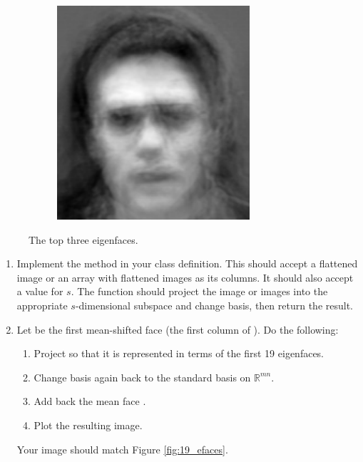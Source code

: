 \begin{figure}
\begin{subfigure}[b]{0.3\textwidth}
\end{subfigure}
\begin{subfigure}[b]{0.3\textwidth}
\includegraphics[width=\textwidth]{figures/eigenface2.pdf}
\end{subfigure}
\caption{The top three eigenfaces.}
\label{facialRecognition:eigenfaces}
\end{figure}

\begin{problem}
\label{prob:top_n}
\leavevmode
\begin{enumerate}
\item Implement the method   in your class definition.
This should accept a flattened image or an array with flattened images as its columns.
It should also accept a value for $s$.
The function should project the image or images into the appropriate $s$-dimensional subspace and change basis, then return the result.
\item Let  be the first mean-shifted face (the first column of ). Do the following:
\begin{enumerate}
\item Project  so that it is represented in terms of the first 19 eigenfaces.
\item Change basis again back to the standard basis on $\mathbb{R}^{mn}$.
\item Add back the mean face .
\item Plot the resulting image.
\end{enumerate}
Your image should match Figure \ref{fig:19_efaces}.
\end{enumerate}
\end{problem}


